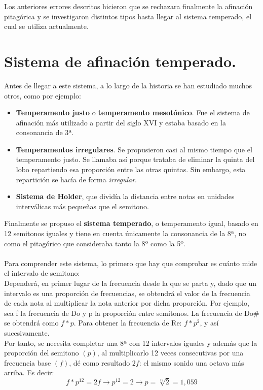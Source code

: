 \documentclass[a4paper, openright, 11pt, titlepage]{report}
\theoremstyle{definition}\newtheorem{defin}[propo]{Definition}
\theoremstyle{definition}\newtheorem{obser}[propo]{Remark}
\theoremstyle{definition}\newtheorem{ejem}[propo]{Ejemplo}
\theoremstyle{definition}\newtheorem{algoritmo}[propo]{Algoritmo}
\begin{document}
Los anteriores errores descritos hicieron que se rechazara finalmente la afinación pitagórica y se investigaron distintos tipos hasta llegar al sistema temperado, el cual se utiliza actualmente.

\section{Sistema de afinación temperado.}
Antes de llegar a este sistema, a lo largo de la historia se han estudiado muchos otros, como por ejemplo: 
\begin{itemize}
    \item \textbf{Temperamento justo} o \textbf{temperamento mesotónico}. Fue el sistema de afinación más utilizado a partir del siglo XVI y estaba basado en la consonancia de 3ª. 
    \item \textbf{Temperamentos irregulares}. Se propusieron casi al mismo tiempo que el temperamento justo. Se llamaba así porque trataba de eliminar la quinta del lobo repartiendo esa proporción entre las otras quintas. Sin embargo, esta repartición se hacía de forma \textit{irregular}.
    \item \textbf{Sistema de Holder}, que dividía la distancia entre notas en unidades interválicas más pequeñas que el semitono.
\end{itemize}
Finalmente se propuso el \textbf{sistema temperado}, o temperamento igual, basado en 12 semitonos iguales y tiene en cuenta únicamente la consonancia de la 8ª, no como el pitagórico que consideraba tanto la 8º como la 5º.\\\\
Para comprender este sistema, lo primero que hay que comprobar es cuánto mide el intervalo de semitono:\\
Dependerá, en primer lugar de la frecuencia desde la que se parta y, dado que un intervalo es una proporción de frecuencias, se obtendrá el valor de la frecuencia de cada nota al multiplicar la nota anterior por dicha proporción. Por ejemplo, sea f la frecuencia de Do y p la proporción entre semitonos. La frecuencia de Do# se obtendrá como $f*p$. Para obtener la frecuencia de Re: $f*p^{2}$, y así sucesivamente.\\
Por tanto, se necesita completar una 8ª con 12 intervalos iguales y además que la proporción del semitono $(p)$, al multiplicarlo 12 veces consecutivas por una frecuencia base $(f)$, dé como resultado $2f$: el mismo sonido una octava más arriba. Es decir: $$f*p^{12} = 2f \longrightarrow p^{12} = 2 \longrightarrow p = \sqrt[12]{2} = 1,059$$
\end{document}
